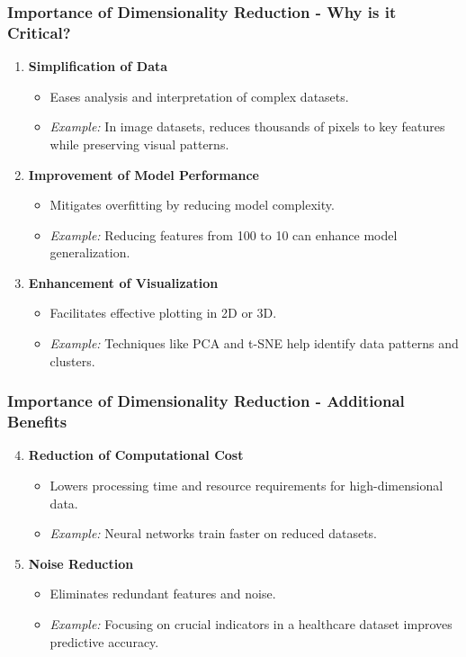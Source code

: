 \documentclass[aspectratio=169]{beamer}
\begin{document}
\begin{frame}[fragile]
    \frametitle{Importance of Dimensionality Reduction - Why is it Critical?}
    \begin{enumerate}
        \item \textbf{Simplification of Data}
            \begin{itemize}
                \item Eases analysis and interpretation of complex datasets.
                \item \textit{Example:} In image datasets, reduces thousands of pixels to key features while preserving visual patterns.
            \end{itemize}
        
        \item \textbf{Improvement of Model Performance}
            \begin{itemize}
                \item Mitigates overfitting by reducing model complexity.
                \item \textit{Example:} Reducing features from 100 to 10 can enhance model generalization.
            \end{itemize}
        
        \item \textbf{Enhancement of Visualization}
            \begin{itemize}
                \item Facilitates effective plotting in 2D or 3D.
                \item \textit{Example:} Techniques like PCA and t-SNE help identify data patterns and clusters.
            \end{itemize}
    \end{enumerate}
\end{frame}

\begin{frame}[fragile]
    \frametitle{Importance of Dimensionality Reduction - Additional Benefits}
    \begin{enumerate}
        \setcounter{enumi}{3} %
        \item \textbf{Reduction of Computational Cost}
            \begin{itemize}
                \item Lowers processing time and resource requirements for high-dimensional data.
                \item \textit{Example:} Neural networks train faster on reduced datasets.
            \end{itemize}

        \item \textbf{Noise Reduction}
            \begin{itemize}
                \item Eliminates redundant features and noise.
                \item \textit{Example:} Focusing on crucial indicators in a healthcare dataset improves predictive accuracy.
            \end{itemize}
    \end{enumerate}
\end{frame}
\end{document}
